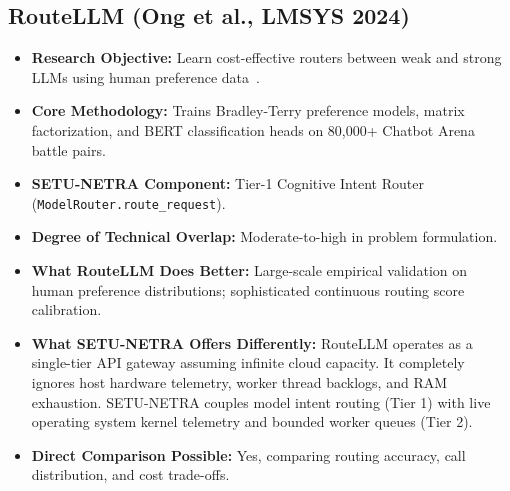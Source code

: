 \documentclass[11pt,a4paper]{article}
\begin{document}
\subsection{RouteLLM (Ong et al., LMSYS 2024)}
\begin{itemize}[leftmargin=*]
    \item \textbf{Research Objective:} Learn cost-effective routers between weak and strong LLMs using human preference data~\cite{Ong2024RouteLLM}.
    \item \textbf{Core Methodology:} Trains Bradley-Terry preference models, matrix factorization, and BERT classification heads on 80,000+ Chatbot Arena battle pairs.
    \item \textbf{SETU-NETRA Component:} Tier-1 Cognitive Intent Router (\texttt{ModelRouter.route\_request}).
    \item \textbf{Degree of Technical Overlap:} Moderate-to-high in problem formulation.
    \item \textbf{What RouteLLM Does Better:} Large-scale empirical validation on human preference distributions; sophisticated continuous routing score calibration.
    \item \textbf{What SETU-NETRA Offers Differently:} RouteLLM operates as a single-tier API gateway assuming infinite cloud capacity. It completely ignores host hardware telemetry, worker thread backlogs, and RAM exhaustion. SETU-NETRA couples model intent routing (Tier 1) with live operating system kernel telemetry and bounded worker queues (Tier 2).
    \item \textbf{Direct Comparison Possible:} Yes, comparing routing accuracy, call distribution, and cost trade-offs.
\end{itemize}

\end{document}
